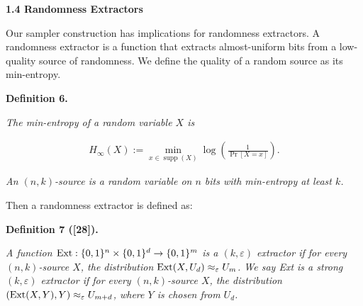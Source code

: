 \par\medskip\noindent\textbf{
1.4 Randomness Extractors}\par




Our sampler construction has implications for randomness extractors.
A randomness extractor is a function that extracts almost-uniform bits from a low-quality source of randomness. We define the quality of a random source as its min-entropy.\par





\par\medskip\noindent\textbf{
\textbf{Definition 6}\textbf{.}
}\par



\emph{The min-entropy of a random variable $X$ is}\par


\[\begin{gathered}
H_{\infty}(X):=\min_{x\in\operatorname*{supp}(X)}\log\left(\frac{1}{\Pr[X=x]}\right).
\end{gathered}\]




\emph{An $(n,k)$-source is a random variable on $n$ bits with min-entropy at least $k$.}\par






Then a randomness extractor is defined as:\par





\par\medskip\noindent\textbf{
\textbf{Definition 7}\textbf{ }([28])\textbf{.}
}\par



\emph{A function $\textup{{Ext}}:\{0,1\}^{n}\times\{0,1\}^{d}\rightarrow\{0,1\}^{m}$ is a $(k,\varepsilon)$ extractor if for every $(n,k)$-source $X$, the distribution $\textup{{Ext}}(X,U_{d})\approx_{\varepsilon}U_{m}$. We say Ext is a strong $(k,\varepsilon)$ extractor if for every $(n,k)$-source $X$, the distribution $(\textup{{Ext}}(X,Y),Y)\approx_{\varepsilon}U_{m+d}$, where $Y$ is chosen from $U_{d}$.}\par



